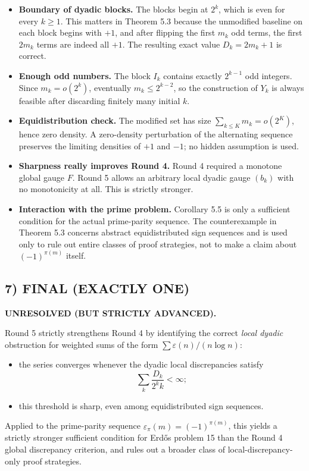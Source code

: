 \begin{itemize}
\item \textbf{Boundary of dyadic blocks.}  The blocks begin at \(2^k\), which is even for every \(k\ge 1\).  This matters in Theorem 5.3 because the unmodified baseline on each block begins with \(+1\), and after flipping the first \(m_k\) odd terms, the first \(2m_k\) terms are indeed all \(+1\).  The resulting exact value \(D_k=2m_k+1\) is correct.
\item \textbf{Enough odd numbers.}  The block \(I_k\) contains exactly \(2^{k-1}\) odd integers.  Since \(m_k=o(2^k)\), eventually \(m_k\le 2^{k-2}\), so the construction of \(Y_k\) is always feasible after discarding finitely many initial \(k\).
\item \textbf{Equidistribution check.}  The modified set has size \(\sum_{k\le K}m_k=o(2^K)\), hence zero density.  A zero-density perturbation of the alternating sequence preserves the limiting densities of \(+1\) and \(-1\); no hidden assumption is used.
\item \textbf{Sharpness really improves Round 4.}  Round 4 required a monotone global gauge \(F\).  Round 5 allows an arbitrary local dyadic gauge \((b_k)\) with no monotonicity at all.  This is strictly stronger.
\item \textbf{Interaction with the prime problem.}  Corollary 5.5 is only a sufficient condition for the actual prime-parity sequence.  The counterexample in Theorem 5.3 concerns abstract equidistributed sign sequences and is used only to rule out entire classes of proof strategies, not to make a claim about \((-1)^{\pi(m)}\) itself.
\end{itemize}

\subsection{7) FINAL (EXACTLY ONE)}

\textbf{UNRESOLVED (BUT STRICTLY ADVANCED).}

Round 5 strictly strengthens Round 4 by identifying the correct \emph{local dyadic} obstruction for weighted sums of the form \(\sum \varepsilon(n)/(n\log n)\):
\begin{itemize}
\item the series converges whenever the dyadic local discrepancies satisfy
\[
\sum_k \frac{D_k}{2^k k}<\infty;
\]
\item this threshold is sharp, even among equidistributed sign sequences.
\end{itemize}
Applied to the prime-parity sequence \(\varepsilon_\pi(m)=(-1)^{\pi(m)}\), this yields a strictly stronger sufficient condition for Erd\H{o}s problem 15 than the Round 4 global discrepancy criterion, and rules out a broader class of local-discrepancy-only proof strategies.

